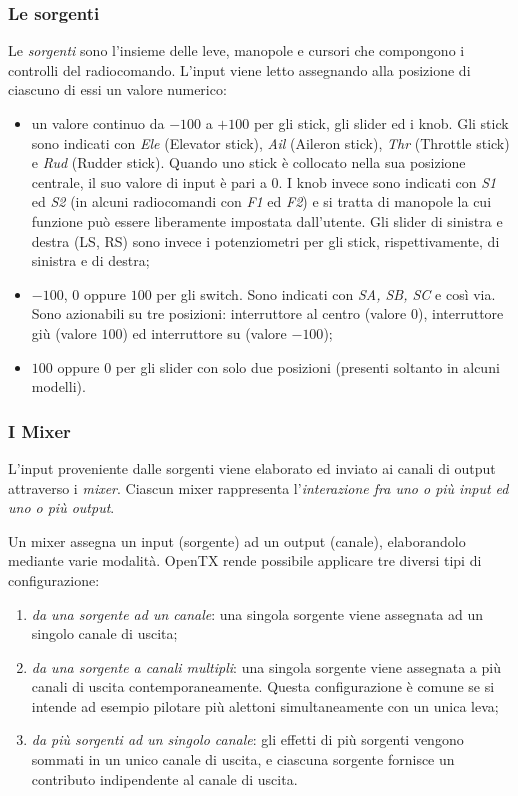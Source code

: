 \documentclass[a4paper, 12pt]{report} %
\begin{document}
\subsubsection{Le sorgenti}
Le \emph{sorgenti} sono l'insieme delle leve, manopole e cursori che compongono i controlli del radiocomando. L'input viene letto assegnando alla posizione di ciascuno di essi un valore numerico:
\begin{itemize}
        \item un valore continuo da $-100$ a $+100$ per gli stick, gli slider ed i knob. Gli stick sono indicati con \emph{Ele} (Elevator stick), \emph{Ail} (Aileron stick), \emph{Thr} (Throttle stick) e \emph{Rud} (Rudder stick). Quando uno stick è collocato nella sua posizione centrale, il suo valore di input è pari a $0$. I knob invece sono indicati con \emph{S1} ed \emph{S2} (in alcuni radiocomandi con \emph{F1} ed \emph{F2}) e si tratta di manopole la cui funzione può essere liberamente impostata dall'utente. Gli slider di sinistra e destra (LS, RS) sono invece i potenziometri per gli stick, rispettivamente, di sinistra e di destra;
        \item $-100$, $0$ oppure $100$ per gli switch. Sono indicati con \emph{SA, SB, SC} e così via. Sono azionabili su tre posizioni: interruttore al centro (valore $0$), interruttore giù (valore $100$) ed interruttore su (valore $-100$);

        \item $100$ oppure $0$ per gli slider con solo due posizioni (presenti soltanto in alcuni modelli).
\end{itemize}

\subsubsection{I Mixer}
L'input proveniente dalle sorgenti viene elaborato ed inviato ai canali di output attraverso i \emph{mixer}. Ciascun mixer rappresenta l'\emph{interazione fra uno o più input ed uno o più output}. 

Un mixer assegna un input (sorgente) ad un output (canale), elaborandolo mediante varie modalità. OpenTX rende possibile applicare tre diversi tipi di configurazione:
\begin{enumerate}
        \item \emph{da una sorgente ad un canale}: una singola sorgente viene assegnata ad un singolo canale di uscita;
        \item \emph{da una sorgente a canali multipli}: una singola sorgente viene assegnata a più canali di uscita contemporaneamente. Questa configurazione è comune se si intende ad esempio pilotare più alettoni simultaneamente con un unica leva;
        \item \emph{da più sorgenti ad un singolo canale}: gli effetti di più sorgenti vengono sommati in un unico canale di uscita, e ciascuna sorgente fornisce un contributo indipendente al canale di uscita.
\end{enumerate}
\end{document}
